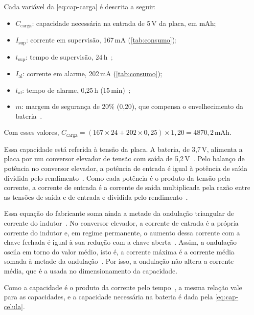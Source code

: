 Cada variável da \autoref{eq:cap-carga} é descrita a seguir:

\begin{itemize}
  \item $C_{\mathrm{carga}}$: capacidade necessária na entrada de 5\,V da
        placa, em mAh;
  \item $I_{\mathrm{sup}}$: corrente em supervisão, 167\,mA
        (\autoref{tab:consumo});
  \item $t_{\mathrm{sup}}$: tempo de supervisão, 24\,h~\cite[item~5.3]{cbmmg2017it14};
  \item $I_{\mathrm{al}}$: corrente em alarme, 202\,mA
        (\autoref{tab:consumo});
  \item $t_{\mathrm{al}}$: tempo de alarme, 0,25\,h (15\,min)~\cite[item~5.3]{cbmmg2017it14};
  \item $m$: margem de segurança de 20\% (0,20), que compensa o
        envelhecimento da bateria~\cite{hammerberg2021calculation}.
\end{itemize}

Com esses valores,
$C_{\mathrm{carga}} = (167 \times 24 + 202 \times 0{,}25) \times 1{,}20
= 4870{,}2$\,mAh.

Essa capacidade está referida à tensão da placa. A bateria, de 3,7\,V,
alimenta a placa por um conversor elevador de tensão com saída de 5,2\,V~\cite{adafruit_powerboost1000c}. Pelo balanço de potência no conversor
elevador, a potência de entrada é igual à potência de saída dividida pelo
rendimento~\cite[p.~3, Eq.~1]{ti_snva731}. Como cada potência é o produto
da tensão pela corrente, a corrente de entrada é a corrente de saída
multiplicada pela razão entre as tensões de saída e de entrada e dividida
pelo rendimento~\cite[p.~3, Eq.~2]{ti_snva731}.

Essa equação do fabricante soma ainda a metade da ondulação triangular
de corrente do indutor~\cite[p.~3]{ti_snva731}. No conversor elevador, a
corrente de entrada é a própria corrente do indutor e, em regime
permanente, o aumento dessa corrente com a chave fechada é igual à sua
redução com a chave aberta~\cite[p.~1 e 5]{ti_slva061}.
Assim, a ondulação oscila em torno do valor médio, isto é, a corrente máxima é a
corrente média somada à metade da ondulação~\cite[p.~3, Eq.~4]{ti_slva372}.
Por isso, a ondulação não altera a corrente média, que é a usada no
dimensionamento da capacidade.

Como a capacidade é o produto da corrente pelo tempo~\cite{bu402_crate},
a mesma relação vale para as capacidades, e a capacidade necessária na
bateria é dada pela \autoref{eq:cap-celula}.

